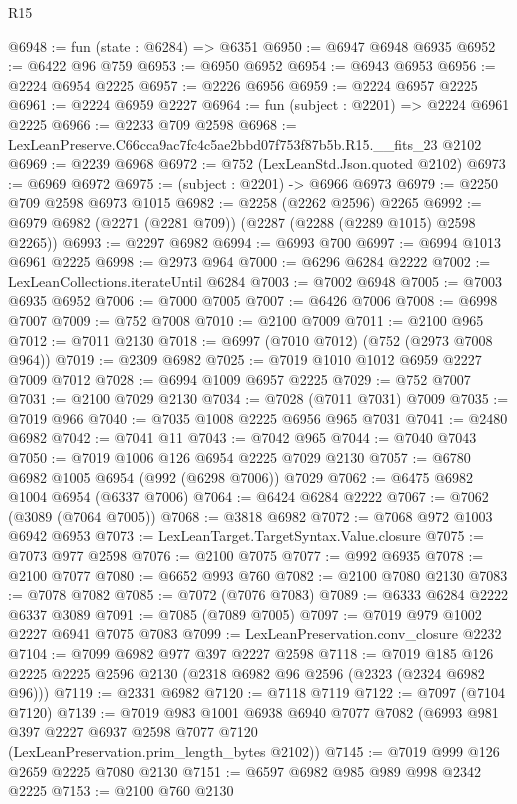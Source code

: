 \begin{lexlean}{R15}
\begin{coremodule}
@6948 := fun (state : @6284) => @6351
@6950 := @6947 @6948 @6935
@6952 := @6422 @96 @759
@6953 := @6950 @6952
@6954 := @6943 @6953
@6956 := @2224 @6954 @2225
@6957 := @2226 @6956
@6959 := @2224 @6957 @2225
@6961 := @2224 @6959 @2227
@6964 := fun (subject : @2201) => @2224 @6961 @2225
@6966 := @2233 @709 @2598
@6968 := LexLeanPreserve.C66cca9ac7fc4c5ae2bbd07f753f87b5b.R15.__fits_23 @2102
@6969 := @2239 @6968
@6972 := @752 (LexLeanStd.Json.quoted @2102)
@6973 := @6969 @6972
@6975 := (subject : @2201) -> @6966 @6973
@6979 := @2250 @709 @2598 @6973 @1015
@6982 := @2258 (@2262 @2596) @2265
@6992 := @6979 @6982 (@2271 (@2281 @709)) (@2287 (@2288 (@2289 @1015) @2598 @2265))
@6993 := @2297 @6982
@6994 := @6993 @700
@6997 := @6994 @1013 @6961 @2225
@6998 := @2973 @964
@7000 := @6296 @6284 @2222
@7002 := LexLeanCollections.iterateUntil @6284
@7003 := @7002 @6948
@7005 := @7003 @6935 @6952
@7006 := @7000 @7005
@7007 := @6426 @7006
@7008 := @6998 @7007
@7009 := @752 @7008
@7010 := @2100 @7009
@7011 := @2100 @965
@7012 := @7011 @2130
@7018 := @6997 (@7010 @7012) (@752 (@2973 @7008 @964))
@7019 := @2309 @6982
@7025 := @7019 @1010 @1012 @6959 @2227 @7009 @7012
@7028 := @6994 @1009 @6957 @2225
@7029 := @752 @7007
@7031 := @2100 @7029 @2130
@7034 := @7028 (@7011 @7031) @7009
@7035 := @7019 @966
@7040 := @7035 @1008 @2225 @6956 @965 @7031
@7041 := @2480 @6982
@7042 := @7041 @11
@7043 := @7042 @965
@7044 := @7040 @7043
@7050 := @7019 @1006 @126 @6954 @2225 @7029 @2130
@7057 := @6780 @6982 @1005 @6954 (@992 (@6298 @7006)) @7029
@7062 := @6475 @6982 @1004 @6954 (@6337 @7006)
@7064 := @6424 @6284 @2222
@7067 := @7062 (@3089 (@7064 @7005))
@7068 := @3818 @6982
@7072 := @7068 @972 @1003 @6942 @6953
@7073 := LexLeanTarget.TargetSyntax.Value.closure
@7075 := @7073 @977 @2598
@7076 := @2100 @7075
@7077 := @992 @6935
@7078 := @2100 @7077
@7080 := @6652 @993 @760
@7082 := @2100 @7080 @2130
@7083 := @7078 @7082
@7085 := @7072 (@7076 @7083)
@7089 := @6333 @6284 @2222 @6337 @3089
@7091 := @7085 (@7089 @7005)
@7097 := @7019 @979 @1002 @2227 @6941 @7075 @7083
@7099 := LexLeanPreservation.conv_closure @2232
@7104 := @7099 @6982 @977 @397 @2227 @2598
@7118 := @7019 @185 @126 @2225 @2225 @2596 @2130 (@2318 @6982 @96 @2596 (@2323 (@2324 @6982 @96)))
@7119 := @2331 @6982
@7120 := @7118 @7119
@7122 := @7097 (@7104 @7120)
@7139 := @7019
    @983
    @1001
    @6938
    @6940
    @7077
    @7082
    (@6993 @981 @397 @2227 @6937 @2598 @7077 @7120 (LexLeanPreservation.prim_length_bytes @2102))
@7145 := @7019 @999 @126 @2659 @2225 @7080 @2130
@7151 := @6597 @6982 @985 @989 @998 @2342 @2225
@7153 := @2100 @760 @2130

\end{coremodule}
\end{lexlean}
